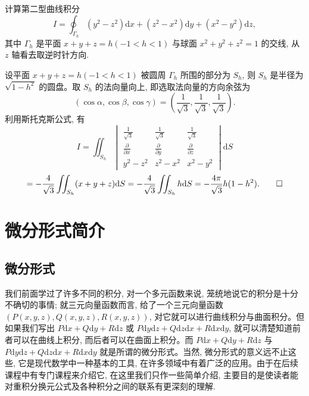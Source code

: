 \begin{example}\label{example:ma-16-5-5}
计算第二型曲线积分
\[
  I=\oint_{\Gamma_h}(y^2-z^2)\mathrm dx+(z^2-x^2)\mathrm dy+(x^2-y^2)\mathrm dz,
\]
其中 $\Gamma_h$ 是平面 $x+y+z=h(-1<h<1)$ 与球面 $x^2+y^2+z^2=1$ 的交线, 从 $z$ 轴看去取逆时针方向.
\end{example}


\begin{solve}
设平面 $x+y+z=h(-1<h<1)$ 被圆周 $\Gamma_h$ 所围的部分为 $S_h$, 则 $S_h$ 是半径为 $\sqrt{1-h^2}$ 的圆盘。取 $S_h$ 的法向量向上, 即选取法向量的方向余弦为
\[
  (\cos\alpha,\cos\beta,\cos\gamma)=\left(\frac1{\sqrt3},\frac1{\sqrt3},\frac1{\sqrt3}\right).
\]
利用斯托克斯公式, 有
\[
  I=\iint_{S_h}
  \begin{vmatrix}
    \frac1{\sqrt3}&\frac1{\sqrt3}&\frac1{\sqrt3}\\
    \frac{\partial}{\partial x}&\frac{\partial}{\partial y}&\frac{\partial}{\partial z}\\
    y^2-z^2&z^2-x^2&x^2-y^2
  \end{vmatrix}\mathrm dS
\]
\[
  =-\frac4{\sqrt3}\iint_{S_h}(x+y+z)\mathrm dS
  =-\frac4{\sqrt3}\iint_{S_h}h\mathrm dS
  =-\frac{4\pi}{\sqrt3}h(1-h^2).
\qedhere
\]
\end{solve}


\section{微分形式简介}
\label{sec:ma-16-6}

\subsection{微分形式}
\label{subsec:ma-16-6-1}

我们前面学过了许多不同的积分, 对一个多元函数来说, 笼统地说它的积分是十分不确切的事情; 就三元向量函数而言, 给了一个三元向量函数 $(P(x,y,z),Q(x,y,z),R(x,y,z))$, 对它就可以进行曲线积分与曲面积分。但如果我们写出 $P\mathrm dx+Q\mathrm dy+R\mathrm dz$ 或 $P\mathrm dy\mathrm dz+Q\mathrm dz\mathrm dx+R\mathrm dx\mathrm dy$, 就可以清楚知道前者可以在曲线上积分, 而后者可以在曲面上积分。而 $P\mathrm dx+Q\mathrm dy+R\mathrm dz$ 与 $P\mathrm dy\mathrm dz+Q\mathrm dz\mathrm dx+R\mathrm dx\mathrm dy$ 就是所谓的微分形式。当然, 微分形式的意义远不止这些, 它是现代数学中一种基本的工具, 在许多领域中有着广泛的应用。由于在后续课程中有专门课程来介绍它, 在这里我们只作一些简单介绍, 主要目的是使读者能对重积分换元公式及各种积分之间的联系有更深刻的理解.

